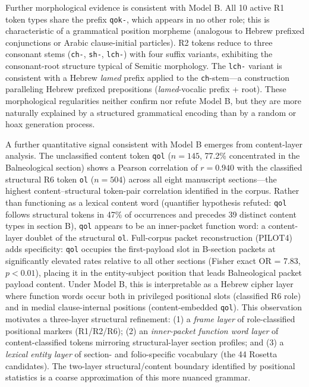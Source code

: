 \documentclass[11pt,a4paper,twocolumn]{article}
\begin{document}
Further morphological evidence is consistent with Model B. All 10 active R1 token types share the prefix \texttt{qok-}, which appears in no other role; this is characteristic of a grammatical position morpheme (analogous to Hebrew prefixed conjunctions or Arabic clause-initial particles). R2 tokens reduce to three consonant stems (\texttt{ch-}, \texttt{sh-}, \texttt{lch-}) with four suffix variants, exhibiting the consonant-root structure typical of Semitic morphology. The \texttt{lch-} variant is consistent with a Hebrew \textit{lamed} prefix applied to the \texttt{ch}-stem---a construction paralleling Hebrew prefixed prepositions (\textit{lamed}-vocalic prefix + root). These morphological regularities neither confirm nor refute Model B, but they are more naturally explained by a structured grammatical encoding than by a random or hoax generation process.

A further quantitative signal consistent with Model B emerges from content-layer analysis. The unclassified content token \texttt{qol} ($n = 145$, 77.2\% concentrated in the Balneological section) shows a Pearson correlation of $r = 0.940$ with the classified structural R6 token \texttt{ol} ($n = 504$) across all eight manuscript sections---the highest content--structural token-pair correlation identified in the corpus. Rather than functioning as a lexical content word (quantifier hypothesis refuted: \texttt{qol} follows structural tokens in 47\% of occurrences and precedes 39 distinct content types in section B), \texttt{qol} appears to be an inner-packet function word: a content-layer doublet of the structural \texttt{ol}. Full-corpus packet reconstruction (PILOT4) adds specificity: \texttt{qol} occupies the first-payload slot in B-section packets at significantly elevated rates relative to all other sections (Fisher exact OR = 7.83, $p < 0.01$), placing it in the entity-subject position that leads Balneological packet payload content. Under Model B, this is interpretable as a Hebrew cipher layer where function words occur both in privileged positional slots (classified R6 role) and in medial clause-internal positions (content-embedded \texttt{qol}). This observation motivates a three-layer structural refinement: (1) a \textit{frame layer} of role-classified positional markers (R1/R2/R6); (2) an \textit{inner-packet function word layer} of content-classified tokens mirroring structural-layer section profiles; and (3) a \textit{lexical entity layer} of section- and folio-specific vocabulary (the 44 Rosetta candidates). The two-layer structural/content boundary identified by positional statistics is a coarse approximation of this more nuanced grammar.
\end{document}
